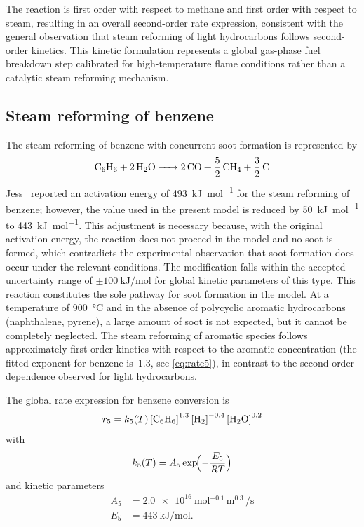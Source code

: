 The reaction is first order with respect to methane and first order with respect to steam, resulting in an overall second-order rate expression, consistent with the general observation that steam reforming of light hydrocarbons follows second-order kinetics. This kinetic formulation represents a global gas-phase fuel breakdown step calibrated for high-temperature flame conditions rather than a catalytic steam reforming mechanism.

\subsection{Steam reforming of benzene}\label{ssec:steam_reforming_benzene}

The steam reforming of benzene with concurrent soot formation is represented by
%
\begin{equation}
  \ce{C6H6 + 2 H2O -> 2 CO + \frac{5}{2} CH4 + \frac{3}{2} C}
  \label{eq:rxn5}
\end{equation}
%
Jess~\cite{Jess1996} reported an activation energy of \SI{493}{\kilo\joule\per\mole} for the steam reforming of benzene; however, the value used in the present model is reduced by \SI{50}{\kilo\joule\per\mole} to \SI{443}{\kilo\joule\per\mole}. This adjustment is necessary because, with the original activation energy, the reaction does not proceed in the model and no soot is formed, which contradicts the experimental observation that soot formation does occur under the relevant conditions. The modification falls within the accepted uncertainty range of \(\pm\SI{100}{\kilo\joule\per\mole}\) for global kinetic parameters of this type. This reaction constitutes the sole pathway for soot formation in the model. At a temperature of \SI{900}{\degreeCelsius} and in the absence of polycyclic aromatic hydrocarbons (naphthalene, pyrene), a large amount of soot is not expected, but it cannot be completely neglected. The steam reforming of aromatic species follows approximately first-order kinetics with respect to the aromatic concentration (the fitted exponent for benzene is~1.3, see \cref{eq:rate5}), in contrast to the second-order dependence observed for light hydrocarbons.

%
The global rate expression for benzene conversion is
%
\begin{equation}
  r_5 = k_5(T)\,{[\ce{C6H6}]}^{1.3}\,{[\ce{H2}]}^{-0.4}\,{[\ce{H2O}]}^{0.2}
  \label{eq:rate5}
\end{equation}
%
with
%
\begin{equation}
  k_5(T) = A_5 \exp\!\Bigl(-\frac{E_5}{RT}\Bigr)
  \label{eq:k5}
\end{equation}
%
and kinetic parameters
%
\begin{align}
  A_5 &= \SI{2.0e16}{\mole^{-0.1}\,\metre^{0.3}\,\per\second} \label{eq:A5} \\
  E_5 &= \SI{443}{\kilo\joule\per\mole}. \label{eq:E5}
\end{align}

